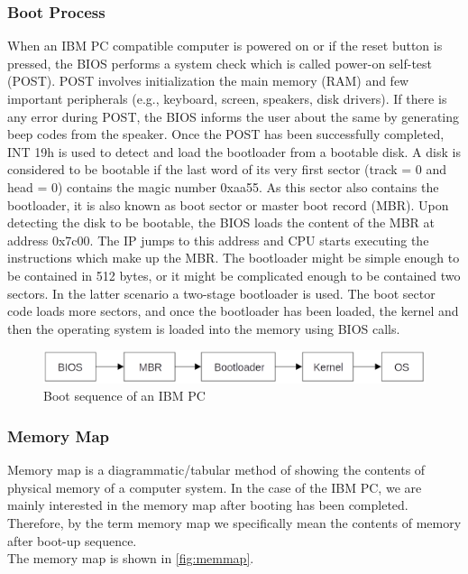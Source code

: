 \subsubsection{Boot Process}
When an IBM PC compatible computer is powered on or if the reset button is pressed, the BIOS performs a system check which is called power-on self-test (POST). POST involves initialization the main memory (RAM) and few important peripherals (e.g., keyboard, screen, speakers, disk drivers). If there is any error during POST, the BIOS informs the user about the same by generating beep codes from the speaker. Once the POST has been successfully completed, INT 19h is used to detect and load the bootloader from a bootable disk. A disk is considered to be bootable if the last word of its very first sector (track = 0 and head = 0) contains the magic number 0xaa55. As this sector also contains the bootloader, it is also known as boot sector or master boot record (MBR). Upon detecting the disk to be bootable, the BIOS loads the content of the MBR at address 0x7c00. The IP jumps to this address and CPU starts executing the instructions which make up the MBR. The bootloader might be simple enough to be contained in 512 bytes, or it might be complicated enough to be contained two sectors. In the latter scenario a two-stage bootloader is used. The boot sector code loads more sectors, and once the bootloader has been loaded, the kernel and then the operating system is loaded into the memory using BIOS calls.
\begin{figure}[h]
  \centering
  \includegraphics[scale=0.25]{figures/Booting.eps}
  \caption{Boot sequence of an IBM PC}
\label{fig:booting}
\end{figure}

\subsubsection{Memory Map}
Memory map is a diagrammatic/tabular method of showing the contents of physical memory of a computer system. In the case of the IBM PC, we are mainly interested in the memory map after booting has been completed. Therefore, by the term memory map we specifically mean the contents of memory after boot-up sequence.\\
The memory map is shown in \autoref{fig:memmap}. 

